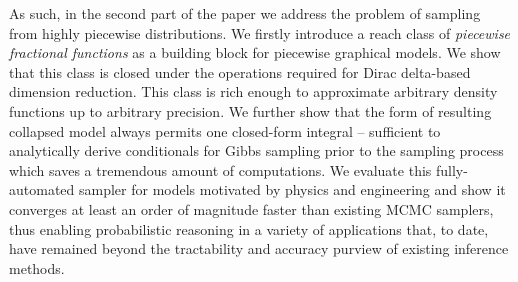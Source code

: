 \documentclass[letterpaper]{article}
\begin{document}
As such, in the second part of the paper we address the problem of sampling from highly piecewise distributions. %
We firstly introduce a reach class of \emph{piecewise fractional functions} as a building block for piecewise graphical models.%
We show that this class is closed under the operations required for Dirac delta-based dimension reduction.
This class is rich enough to approximate arbitrary density functions up to arbitrary precision. 
We further show that the form of resulting collapsed model always permits one closed-form integral -- sufficient to analytically derive conditionals for Gibbs sampling prior to the sampling process which saves a tremendous amount of computations.
We evaluate this fully-automated sampler for models motivated by physics and engineering and show it converges at least an order of magnitude faster than existing MCMC samplers, thus enabling probabilistic reasoning in a variety of applications that, to date, have remained beyond the tractability and accuracy purview of existing inference methods.  


\end{document}
